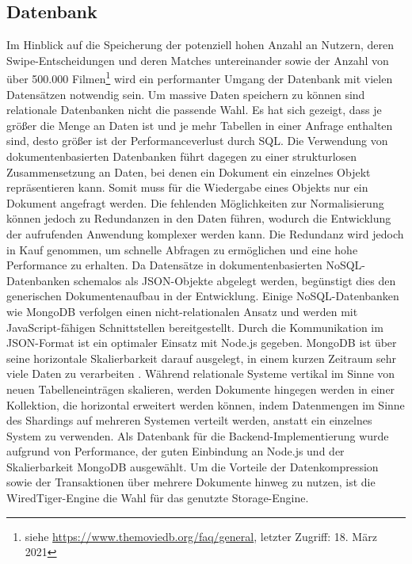 \subsection{Datenbank}
Im Hinblick auf die Speicherung der potenziell hohen Anzahl an Nutzern, deren Swipe-Ent\-schei\-dungen und deren Matches untereinander sowie der Anzahl von über 500.000 Filmen\footnote{siehe \url{https://www.themoviedb.org/faq/general}, letzter Zugriff: 18. März 2021} wird ein performanter Umgang der Datenbank mit vielen Datensätzen notwendig sein.  
Um massive Daten speichern zu können sind relationale Datenbanken nicht die passende Wahl. 
Es hat sich gezeigt, dass je größer die Menge an Daten ist und je mehr Tabellen in einer Anfrage enthalten sind, desto größer ist der Performanceverlust durch SQL. \cite{Tech4.5}
\newline
Die Verwendung von dokumentenbasierten Datenbanken führt dagegen zu einer strukturlosen Zusammensetzung an Daten, bei denen ein Dokument ein einzelnes Objekt repräsentieren kann. 
Somit muss für die Wiedergabe eines Objekts nur ein Dokument angefragt werden. Die fehlenden Möglichkeiten zur Normalisierung können jedoch zu Redundanzen in den Daten führen, wodurch die Entwicklung der aufrufenden Anwendung komplexer werden kann. 
Die Redundanz wird jedoch in Kauf genommen, um schnelle Abfragen zu ermöglichen und eine hohe Performance zu erhalten. Da Datensätze in dokumentenbasierten NoSQL-Datenbanken schemalos als JSON-Objekte abgelegt werden, begünstigt dies den generischen Dokumentenaufbau in der Entwicklung.
\newline
Einige NoSQL-Datenbanken wie MongoDB verfolgen einen nicht-relationalen Ansatz und werden mit JavaScript-fähigen Schnittstellen bereitgestellt. Durch die Kommunikation im JSON-Format ist ein optimaler Einsatz mit Node.js gegeben. MongoDB ist über seine horizontale Skalierbarkeit darauf ausgelegt, in einem kurzen Zeitraum sehr viele Daten zu verarbeiten \cite{Tech5}. Während relationale Systeme vertikal im Sinne von neuen Tabelleneinträgen skalieren, werden Dokumente hingegen werden in einer Kollektion, die horizontal erweitert werden können, indem Datenmengen im Sinne des Shardings auf mehreren Systemen verteilt werden, anstatt ein einzelnes System zu verwenden.
\newline
Als Datenbank für die Backend-Implementierung wurde aufgrund von Performance, der guten Einbindung an Node.js und der Skalierbarkeit MongoDB ausgewählt. Um die Vorteile der Da\-ten\-kompression sowie der Transaktionen über mehrere Dokumente hinweg zu nutzen, ist die WiredTiger-Engine die Wahl für das genutzte Storage-Engine.  


